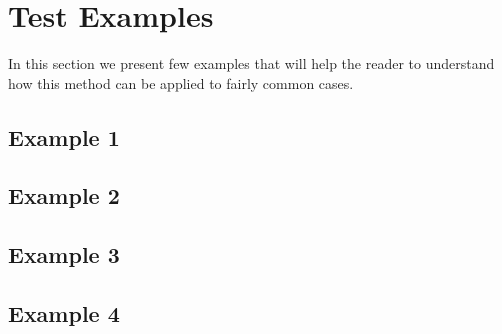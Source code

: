 \section{Test Examples}
\label{sec:test}

In this section we present few examples that will help the reader to understand 
how this method can be applied to fairly common cases.

\subsection{Example 1}
\label{sec:example1}

\subsection{Example 2}
\label{sec:example2}

\subsection{Example 3}
\label{sec:example3}

\subsection{Example 4}
\label{sec:example4}
